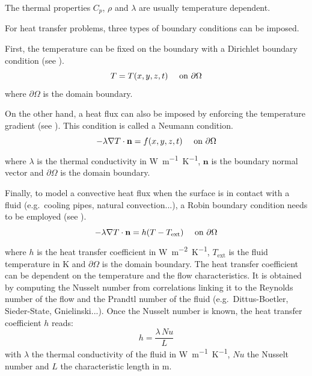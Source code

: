 The thermal properties $C_p$, $\rho$ and $\lambda$ are usually temperature dependent.

For heat transfer problems, three types of boundary conditions can be imposed.

First, the temperature can be fixed on the boundary with a Dirichlet boundary condition (see ).
\begin{equation}
    T = T(x, y, z, t) \quad \text { on } \partial \Omega
    \labeq{dirichlet bc T}
\end{equation}
where $\partial \Omega$ is the domain boundary.

On the other hand, a heat flux can also be imposed by enforcing the temperature gradient (see ).
This condition is called a Neumann condition.
\begin{equation}
    -\lambda \nabla T \cdot \mathbf{n} = f(x, y, z, t) \quad \text { on } \partial \Omega
    \labeq{neumann bc T}
\end{equation}
where $\lambda$ is the thermal conductivity in \si{W.m^{-1}.K^{-1}}, $\mathbf{n}$ is the boundary normal vector and $\partial \Omega$ is the domain boundary.

Finally, to model a convective heat flux when the surface is in contact with a fluid (e.g.\ cooling pipes, natural convection...), a Robin boundary condition needs to be employed (see ).
\begin{equation}
    -\lambda \nabla T \cdot \mathbf{n} = h (T - T_\mathrm{ext}) \quad \text { on } \partial \Omega
    \labeq{convective bc T}
\end{equation}
where $h$ is the heat transfer coefficient in \si{W.m^{-2}.K^{-1}}, $T_\mathrm{ext}$ is the fluid temperature in \si{K} and $\partial \Omega$ is the domain boundary.
The heat transfer coefficient can be dependent on the temperature and the flow characteristics.
It is obtained by computing the Nusselt number from correlations linking it to the Reynolds number of the flow and the Prandtl number of the fluid  (e.g.\ Dittus-Boetler, Sieder-State, Gnielinski...).
Once the Nusselt number is known, the heat transfer coefficient $h$ reads:
\begin{equation}
    h = \frac{\lambda \, \textit{Nu}}{L}
\end{equation}
with $\lambda$ the thermal conductivity of the fluid in \si{W.m^{-1}.K^{-1}}, $\textit{Nu}$ the Nusselt number and $L$ the characteristic length in \si{m}.


